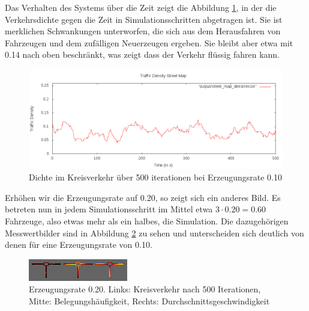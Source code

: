 \documentclass[10pt, a4paper]{article}
\begin{document}
Das Verhalten des Systems über die Zeit zeigt die Abbildung \ref{fig:roundabout010density}, in der die Verkehrsdichte gegen die Zeit in Simulationsschritten abgetragen ist. Sie ist merklichen Schwankungen unterworfen, die sich aus dem Herausfahren von Fahrzeugen und dem zufälligen Neuerzeugen ergeben. Sie bleibt aber etwa mit 0.14 nach oben beschränkt, was zeigt dass der Verkehr flüssig fahren kann.

\begin{figure}[h!]
	\centering
	\includegraphics[width=\textwidth]{img/roundabout_010_densities}
	\caption{Dichte im Kreisverkehr über 500 iterationen bei Erzeugungsrate 0.10}
	\label{fig:roundabout010density}
\end{figure}

Erhöhen wir die Erzeugungsrate auf 0.20, so zeigt sich ein anderes Bild. Es betreten nun in jedem Simulationsschritt im Mittel etwa $3 \cdot 0.20 = 0.60$ Fahrzeuge, also etwas mehr als ein halbes, die Simulation. Die dazugehörigen Messwertbilder sind in Abbildung \ref{fig:roundabout020} zu sehen und unterscheiden sich deutlich von denen für eine Erzeugungsrate von 0.10.

\begin{figure}[h!]
	\centering
	\includegraphics[width=\textwidth]{img/roundabout_020}
	\caption{Erzeugungsrate 0.20. Links: Kreisverkehr nach 500 Iterationen, Mitte: Belegungshäufigkeit, Rechts: Durchschnittsgeschwindigkeit}
	\label{fig:roundabout020}
\end{figure}
\end{document}
